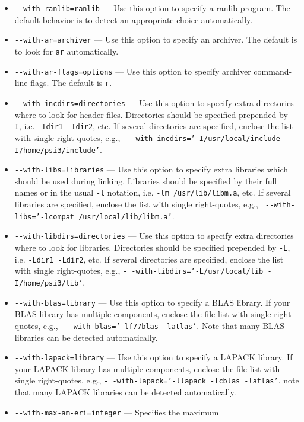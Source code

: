 \documentclass[12pt]{article}
\begin{document}
\begin{itemize}
\item {\tt -}{\tt -with-ranlib=ranlib} --- Use this option to specify
  a ranlib program. The default behavior is to detect an appropriate
  choice automatically.
\item {\tt -}{\tt -with-ar=archiver} --- Use this option to specify an
  archiver.  The default is to look for {\tt ar} automatically.
\item {\tt -}{\tt -with-ar-flags=options} --- Use this option to specify
  archiver command-line flags. The default is {\tt r}.
\item {\tt -}{\tt -with-incdirs=directories} --- Use this option to
  specify extra directories where to look for header
  files. Directories should be specified prepended by {\tt -I},
  i.e. {\tt -Idir1 -Idir2}, etc. If several directories are specified,
  enclose the list with single right-quotes, e.g., {\tt -}{\tt
    -with-incdirs='-I/usr/local/include -I/home/psi3/include'}.
\item {\tt -}{\tt -with-libs=libraries} --- Use this option to specify
  extra libraries which should be used during linking. Libraries
  should be specified by their full names or in the usual {\tt -l}
  notation, i.e. {\tt -lm /usr/lib/libm.a}, etc.  If several libraries
  are specified, enclose the list with single right-quotes, e.g., {\tt
    -}{\tt -with-libs='-lcompat /usr/local/lib/libm.a'}.
\item {\tt -}{\tt -with-libdirs=directories} --- Use this option to
  specify extra directories where to look for libraries. Directories
  should be specified prepended by {\tt -L}, i.e. {\tt -Ldir1 -Ldir2},
  etc. If several directories are specified, enclose the list with
  single right-quotes, e.g., {\tt -}{\tt
    -with-libdirs='-L/usr/local/lib -I/home/psi3/lib'}.
\item {\tt -}{\tt -with-blas=library} --- Use this option to specify a
  BLAS library.  If your BLAS library has multiple components, enclose
  the file list with single right-quotes, e.g., {\tt -}{\tt
    -with-blas='-lf77blas -latlas'}.  Note that many BLAS libraries
  can be detected automatically.
\item {\tt -}{\tt -with-lapack=library} --- Use this option to specify
  a LAPACK library.  If your LAPACK library has multiple components,
  enclose the file list with single right-quotes, e.g., {\tt -}{\tt
    -with-lapack='-llapack -lcblas -latlas'}.  note that many LAPACK
  libraries can be detected automatically.
\item {\tt -}{\tt -with-max-am-eri=integer} --- Specifies the maximum

\end{itemize}
\end{document}

